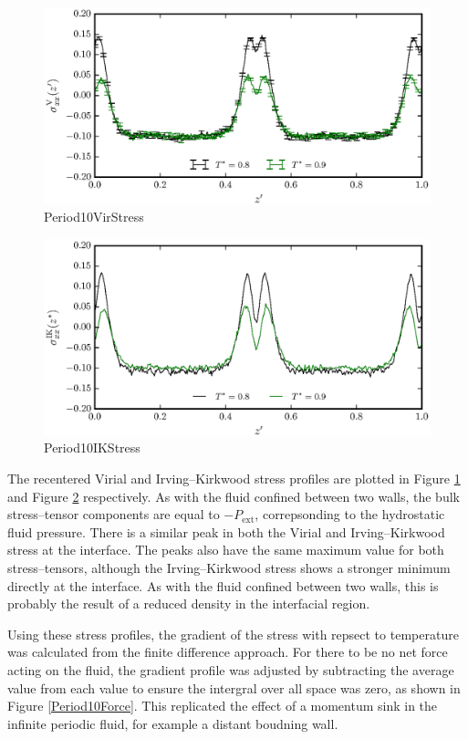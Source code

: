 \begin{figure}[h]
\centering
\includegraphics[scale=0.8]{Period10VirStress}
\caption{Period10VirStress}
\label{Period10VirStress}
\end{figure}

\begin{figure}[h]
\centering
\includegraphics[scale=0.8]{Period10IKStress}
\caption{Period10IKStress}
\label{Period10IKStress}
\end{figure}
The recentered Virial and Irving--Kirkwood stress profiles are plotted in Figure \ref{Period10VirStress} and Figure \ref{Period10IKStress} respectively.
As with the fluid confined between two walls, the bulk stress--tensor components are equal to $-P_{\mathrm{ext}}$, correpsonding to the hydrostatic fluid pressure.
There is a similar peak in both the Virial and Irving--Kirkwood stress at the interface.
The peaks also have the same maximum value for both stress--tensors, although the Irving--Kirkwood stress shows a stronger minimum directly at the interface.
As with the fluid confined between two walls, this is probably the result of a reduced density in the interfacial region.

\FloatBarrier
Using these stress profiles, the gradient of the stress with repsect to temperature was calculated from the finite difference approach.
For there to be no net force acting on the fluid, the gradient profile was adjusted by subtracting the average value from each value to ensure the intergral over all space was zero, as shown in Figure \ref{Period10Force}.
This replicated the effect of a momentum sink in the infinite periodic fluid, for example a distant boudning wall.

